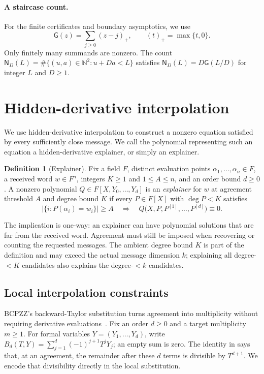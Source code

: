 \documentclass[11pt,letterpaper]{article}
\theoremstyle{definition}
\newtheorem{definition}[definition]{Definition}
\newcommand{\N}{\mathbb{N}}
\begin{document}
 \paragraph{A staircase count.}
For the finite certificates and boundary asymptotics, we use
\begin{equation}
 \mathsf G(z)=\sum_{j\ge0}(z-j)_+,
 \qquad (t)_+=\max\{t,0\}.
 \label{eq:normalized-staircase-function}
\end{equation}
Only finitely many summands are nonzero.
The count $\mathsf N_D(L)=\#\{(u,a)\in\N^2:u+Da<L\}$ satisfies
$\mathsf N_D(L)=D\mathsf G(L/D)$ for integer $L$ and $D\ge1$.
 \section{Hidden-derivative interpolation}
\label{sec:hidden-derivative-interpolation}
We use hidden-derivative interpolation to construct a nonzero equation
satisfied by every sufficiently close message. We call the polynomial
representing such an equation a hidden-derivative explainer, or simply
an explainer.
\begin{definition}[Explainer]
\label{def:explainer}
Fix a field $F$, distinct evaluation points $\alpha_1,\ldots,\alpha_n\in F$,
a received word $w\in F^n$, integers $K\ge1$ and $1\le A\le n$,
and an order bound $d\ge0$.
A nonzero polynomial $Q\in F[X,Y_0,\ldots,Y_d]$ is an
\emph{explainer} for $w$ at agreement threshold $A$ and degree bound $K$
if every $P\in F[X]$ with $\deg P<K$ satisfies
\[
 \bigl|\{i:P(\alpha_i)=w_i\}\bigr|\ge A
 \quad\Longrightarrow\quad
 Q\bigl(X,P,P^{[1]},\ldots,P^{[d]}\bigr)\equiv0.
\]
\end{definition}

The implication is one-way: an explainer can have polynomial solutions
that are far from the received word. Agreement must still be imposed
when recovering or counting the requested messages.
The ambient degree bound $K$ is part of the definition and may exceed
the actual message dimension $k$; explaining all degree-$<K$ candidates also explains
the degree-$<k$ candidates.
 \subsection{Local interpolation constraints}
\label{sec:local-interpolation}
BCPZZ's backward-Taylor substitution turns agreement into multiplicity
without requiring derivative evaluations~\cite[Section~3.1]{BCPZZ26}.
Fix an order $d\ge0$ and a target multiplicity $m\ge1$. For formal
variables $Y=(Y_1,\ldots,Y_d)$, write
$B_d(T,Y)=\sum_{j=1}^d(-1)^{j+1}T^jY_j$; an empty sum is zero.
The identity in  says that, at an
agreement, the remainder after these $d$ terms is divisible by $T^{d+1}$.
We encode that divisibility directly in the local substitution.
\end{document}
